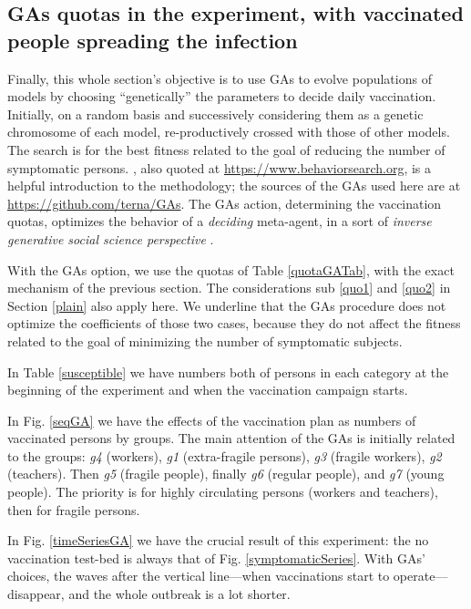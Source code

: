 \documentclass[graybox]{svmult}
\begin{document}
\subsection{GAs quotas in the experiment, with vaccinated people spreading the infection}
\label{GAquotas}

Finally, this whole section's objective is to use GAs to evolve populations of models by choosing ``genetically'' the parameters to decide daily vaccination. Initially, on a random basis and successively considering them as a genetic chromosome of each model, re-productively crossed with those of other models. The search is for the best fitness related to the goal of reducing the number of symptomatic persons. \cite{miller1998active}, also quoted at \href{https://www.behaviorsearch.org}{https://www.behaviorsearch.org}, is a helpful introduction to the methodology; the sources of the GAs used here are at \href{https://github.com/terna/GAs}{https://github.com/terna/GAs}. The GAs action, determining the vaccination quotas, optimizes the behavior of a \emph{deciding} meta-agent, in a sort of \emph{inverse generative social science perspective} \cite{vu2019toward}.

With the GAs option, we use the quotas of Table \ref{quotaGATab}, with the exact mechanism of the previous section. The considerations sub \ref{quo1} and \ref{quo2} in Section \ref{plain} also apply here. We underline that the GAs procedure does not optimize the coefficients of those two cases, because they do not affect the fitness related to the goal of minimizing the number of symptomatic subjects.  

In Table \ref{susceptible} we have numbers both of persons in each category at the beginning of the experiment and when the vaccination campaign starts.

In Fig. \ref{seqGA} we have the effects of the vaccination plan as numbers of vaccinated persons by groups. 
The main attention of the GAs is initially related to the groups: \emph{g4} (workers), \emph{g1} (extra-fragile persons), \emph{g3} (fragile workers), \emph{g2}  (teachers). Then \emph{g5} (fragile people), finally \emph{g6} (regular people), and \emph{g7} (young people).
The priority is for highly circulating persons (workers and teachers), then for fragile persons.

In Fig. \ref{timeSeriesGA} we have the crucial result of this experiment: the no vaccination test-bed is always that of Fig. \ref{symptomaticSeries}. With GAs' choices, the waves after the vertical line---when vaccinations start to operate---disappear, and the whole outbreak is a lot shorter.
\end{document}
